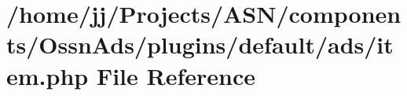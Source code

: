 \hypertarget{components_2_ossn_ads_2plugins_2default_2ads_2item_8php}{}\section{/home/jj/\+Projects/\+A\+S\+N/components/\+Ossn\+Ads/plugins/default/ads/item.php File Reference}
\label{components_2_ossn_ads_2plugins_2default_2ads_2item_8php}
